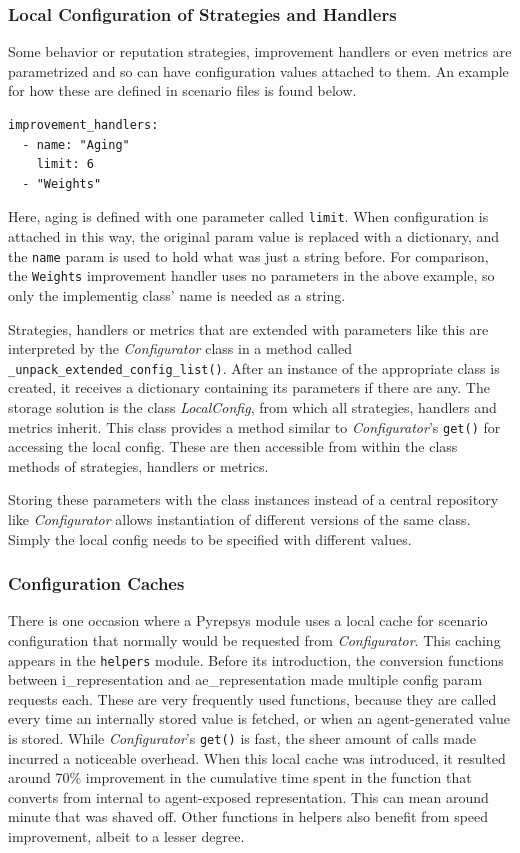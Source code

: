 \documentclass[%
    ]{\PathToTumTemplate/thesis/tum_thesis}
\begin{document}
\subsubsection{Local Configuration of Strategies and Handlers}\label{sec:local_config}
Some behavior or reputation strategies, improvement handlers or even metrics are parametrized and so can have configuration values attached to them.
An example for how these are defined in scenario files is found below.
\begin{lstlisting}
improvement_handlers:
  - name: "Aging"
    limit: 6
  - "Weights"
\end{lstlisting}
Here, aging is defined with one parameter called \texttt{limit}.
When configuration is attached in this way, the original param value is replaced with a dictionary, and the \texttt{name} param is used to hold what was just a string before.
For comparison, the \texttt{Weights} improvement handler uses no parameters in the above example, so only the implementig class' name is needed as a string.

Strategies, handlers or metrics that are extended with parameters like this are interpreted by the \emph{Configurator} class in a method called \lstinline{_unpack_extended_config_list()}.
After an instance of the appropriate class is created, it receives a dictionary containing its parameters if there are any.
The storage solution is the class \emph{LocalConfig}, from which all strategies, handlers and metrics inherit.
This class provides a method similar to \emph{Configurator}'s \lstinline{get()} for accessing the local config.
These are then accessible from within the class methods of strategies, handlers or metrics.

Storing these parameters with the class instances instead of a central repository like \emph{Configurator} allows instantiation of different versions of the same class.
Simply the local config needs to be specified with different values.

\subsubsection{Configuration Caches}
There is one occasion where a Pyrepsys module uses a local cache for scenario configuration that normally would be requested from \emph{Configurator}.
This caching appears in the \texttt{helpers} module.
Before its introduction, the conversion functions between \gls{i_representation} and \gls{ae_representation} made multiple config param requests each.
These are very frequently used functions, because they are called every time an internally stored value is fetched, or when an agent-generated value is stored.
While \emph{Configurator}'s \lstinline{get()} is fast, the sheer amount of calls made incurred a noticeable overhead.
When this local cache was introduced, it resulted around 70\% improvement in the cumulative time spent in the function that converts from internal to agent-exposed representation.
This can mean around minute that was shaved off. 
Other functions in helpers also benefit from speed improvement, albeit to a lesser degree.
\end{document}
